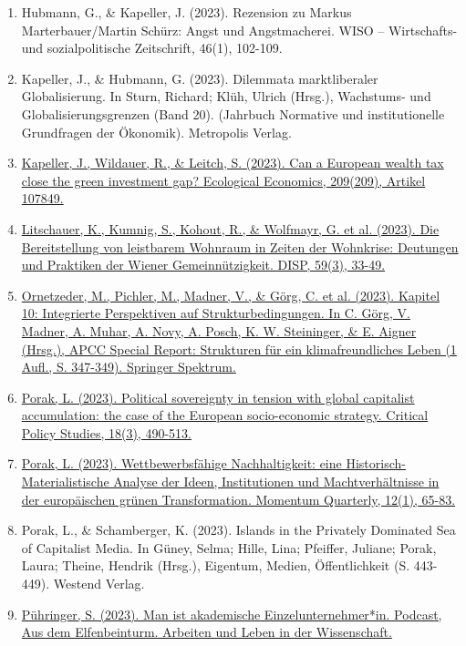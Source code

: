 \begin{enumerate}
	 \item Hubmann, G., \& Kapeller, J. (2023). Rezension zu Markus Marterbauer/Martin Schürz: Angst und Angstmacherei. WISO -- Wirtschafts- und sozialpolitische Zeitschrift, 46(1), 102-109.
	 \item Kapeller, J., \& Hubmann, G. (2023). Dilemmata marktliberaler Globalisierung. In Sturn, Richard; Klüh, Ulrich (Hrsg.), Wachstums- und Globalisierungsgrenzen (Band 20). (Jahrbuch Normative und institutionelle Grundfragen der Ökonomik). Metropolis Verlag.
	 \item \href{https://doi.org/10.1016/j.ecolecon.2023.107849}{Kapeller, J., Wildauer, R., \& Leitch, S. (2023). Can a European wealth tax close the green investment gap? Ecological Economics, 209(209), Artikel 107849.}
	 \item \href{https://doi.org/10.1080/02513625.2023.2288448}{Litschauer, K., Kumnig, S., Kohout, R., \& Wolfmayr, G. et al. (2023). Die Bereitstellung von leistbarem Wohnraum in Zeiten der Wohnkrise: Deutungen und Praktiken der Wiener Gemeinnützigkeit. DISP, 59(3), 33-49.}
	 \item \href{https://doi.org/10.1007/978-3-662-66497-1_14}{Ornetzeder, M., Pichler, M., Madner, V., \& Görg, C. et al. (2023). Kapitel 10: Integrierte Perspektiven auf Strukturbedingungen. In C. Görg, V. Madner, A. Muhar, A. Novy, A. Posch, K. W. Steininger, \& E. Aigner (Hrsg.), APCC Special Report: Strukturen für ein klimafreundliches Leben (1 Aufl., S. 347-349). Springer Spektrum.}
	 \item \href{https://doi.org/10.1080/19460171.2023.2274542}{Porak, L. (2023). Political sovereignty in tension with global capitalist accumulation: the case of the European socio-economic strategy. Critical Policy Studies, 18(3), 490-513.}
	 \item \href{https://doi.org/10.15203/momentumquarterly.vol12.no1.p65-83}{Porak, L. (2023). Wettbewerbsfähige Nachhaltigkeit: eine Historisch-Materialistische Analyse der Ideen, Institutionen und Machtverhältnisse in der europäischen grünen Transformation. Momentum Quarterly, 12(1), 65-83.}
	 \item Porak, L., \& Schamberger, K. (2023). Islands in the Privately Dominated Sea of Capitalist Media. In Güney, Selma; Hille, Lina; Pfeiffer, Juliane; Porak, Laura; Theine, Hendrik (Hrsg.), Eigentum, Medien, Öffentlichkeit (S. 443-449). Westend Verlag.
	 \item \href{https://elfenbeinturm.podigee.io/13-stephan-puehringer#new_tab}{Pühringer, S. (2023). Man ist akademische Einzelunternehmer*in. Podcast, Aus dem Elfenbeinturm. Arbeiten und Leben in der Wissenschaft.}

\end{enumerate}
